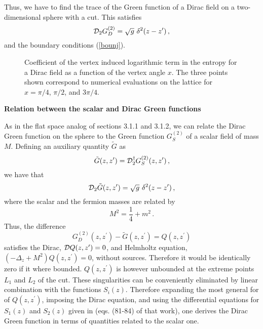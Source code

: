 \documentclass[11pt]{article}
\begin{document}
Thus, we have to find the trace of the Green function of a Dirac field on a two-dimensional sphere with a cut. This  
satisfies
\begin{equation}
{\cal D}_2 G_D^{(2)} =\sqrt{g}\, \,\delta^2(z-z^\prime)\,,
\end{equation}
and the boundary conditions (\ref{bounj}).


 \begin{figure} [tb]
\centering
\leavevmode
\epsfysize=5.3cm
\bigskip
{}
\caption{Coefficient of the vertex induced logarithmic term in the entropy for a Dirac field as a function of the vertex angle $x$. The three points shown correspond to numerical evaluations on the lattice for $x=\pi/4$, $\pi/2$, and $3 \pi/4$.}
\label{ryo}
\end{figure}
 

\smallskip

\noindent\textbf{Relation between the scalar and Dirac Green functions}

\noindent As in the flat space analog of sections 3.1.1 and 3.1.2, we can relate the Dirac Green function on the sphere to the Green function $G_S^{(2)}$ of a scalar field of mass $M$.  Defining an auxiliary quantity $\tilde{G}$ as
\begin{equation}
\tilde{G}(z,z^\prime)={\cal D}^\dagger_2 G_S^{(2)}(z,z^\prime)\,,
\end{equation}
we have that 
\begin{equation}
{\cal D}_2 \tilde{G}(z,z^\prime) =\sqrt{g}\, \,\delta^2(z-z^\prime)\,,
\end{equation}
where the scalar and the fermion masses are related by
\begin{equation}
M^2=\frac{1}{4}+m^2\,.
\end{equation}
Thus, the difference \begin{equation}
G_D^{(2)}(z,z^\prime)-\tilde{G}(z,z^\prime)=Q(z,z^\prime)
\end{equation}
 satisfies the Dirac, $
{\cal D} Q(z,z^\prime)=0$, 
 and Helmholtz equation, $(-\Delta_{z}+M^2)Q(z,z^\prime)=0$, without sources.  Therefore it would be identically zero if it where bounded. $Q(z,z^\prime)$ is however unbounded at the extreme points $L_1$ and $L_2$ of the cut. These singularities can be conveniently eliminated by linear combination with the functions $S_i(z)$. Therefore expanding the most general for of $
Q(z,z^\prime)$, imposing the Dirac equation, and using the differential equations for $S_1(z)$ and $S_2(z)$ given in \cite{log} (eqs. (81-84) of that work), one derives the Dirac Green function in terms of quantities related to the scalar one. 
 
\end{document}
